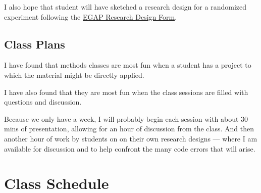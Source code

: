 \documentclass[letterpaper]{inzane_syllabus} %
\begin{document}
I also hope that student will have sketched a research design for a randomized experiment following the \href{https://egap.github.io/theory_and_practice_of_field_experiments/the-research-design-process.html}{EGAP Research Design Form}.

\subsection{Class Plans}

I have found that methods classes are most fun when a student has a project to
which the material might be directly applied.

I have also found that they are most fun when the class sessions are filled
with questions and discussion.

Because we only have a week, I will probably begin each session with about 30
mins of presentation, allowing for an hour of discussion from the class. And
then another hour of work by students on on their own research designs ---
where I am available for discussion and to help confront the many code errors
that will arise.






\newpage %


\makeFullPage

{} \section{Class Schedule}
\SetDate[07/06/2021]
\end{document}

